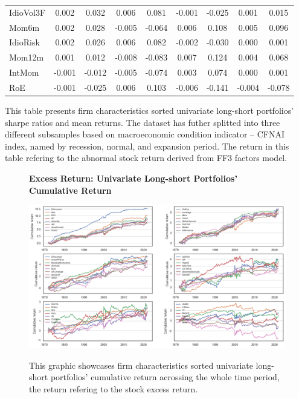 \begin{table}[H]
\begin{tabular}{lcc|cc|cc|cc}
      IdioVol3F & 0.002 & 0.032 & 0.006 & 0.081 & -0.001 & -0.025 & 0.001 & 0.015 \\ 
      Mom6m & 0.002 & 0.028 & -0.005 & -0.064 & 0.006 & 0.108 & 0.005 & 0.096 \\ 
      IdioRisk & 0.002 & 0.026 & 0.006 & 0.082 & -0.002 & -0.030 & 0.000 & 0.001 \\ 
      Mom12m & 0.001 & 0.012 & -0.008 & -0.083 & 0.007 & 0.124 & 0.004 & 0.068 \\ 
      IntMom & -0.001 & -0.012 & -0.005 & -0.074 & 0.003 & 0.074 & 0.000 & 0.001 \\ 
      RoE & -0.001 & -0.025 & 0.006 & 0.103 & -0.006 & -0.141 & -0.004 & -0.078 \\ \hline
  \end{tabular}
  \begin{tablenotes}
    \footnotesize
    \item This table presents firm characteristics sorted univariate long-short portfolios' sharpe ratios and mean returns. The dataset has futher splitted into three different subsamples based on macroeconomic condition indicator -- CFNAI index, named by recession, normal, and expansion period. The return in this table refering to the abnormal stock return derived from FF3 factors model.
  \end{tablenotes}
\end{table}

\begin{figure}[H]
  \centering
  \caption{\textbf{Excess Return: Univariate Long-short Portfolios' Cumulative Return}}
  \includegraphics[width=.8\textwidth]{images/univariate_ls_cum_ret_excess.png}
  \label{fig: excess univariate ls cumulative return}
  \caption*{\footnotesize{This graphic showcases firm characteristics sorted univariate long-short portfolios' cumulative return acrossing the whole time period, the return refering to the stock excess return.}}
\end{figure}

